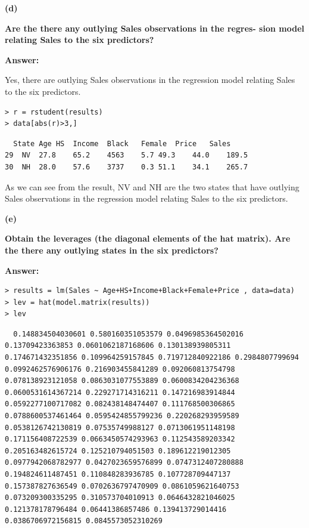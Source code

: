 \documentclass[letterpaper,11pt]{article}
\begin{document}
\begin{addmargin}[-1.1em]{0em}
  \textbf{(d)}\par
\end{addmargin}
\textbf{Are the there any outlying Sales observations in the regres- sion model relating Sales to the six predictors?}\par
\bigbreak
\begin{addmargin}[-0.5em]{0em}
  \textbf{Answer: }
\end{addmargin}

Yes, there are outlying Sales observations in the regression model relating Sales to the six predictors.\par
\begin{lstlisting}
> r = rstudent(results)
> data[abs(r)>3,]
\end{lstlisting}

\begin{lstlisting}
  State	Age	HS	Income	Black	Female	Price	Sales
29	NV	27.8	65.2	4563	5.7	49.3	44.0	189.5
30	NH	28.0	57.6	3737	0.3	51.1	34.1	265.7
\end{lstlisting}

As we can see from the result, NV and NH are the two states that have outlying Sales observations in the regression model relating Sales to the six predictors.

\begin{addmargin}[-1.1em]{0em}
  \textbf{(e)}\par
\end{addmargin}
\textbf{Obtain the leverages (the diagonal elements of the hat matrix). Are the there any outlying states in the six predictors?}\par
\bigbreak
\begin{addmargin}[-0.5em]{0em}
  \textbf{Answer: }
\end{addmargin}

\begin{lstlisting}
> results = lm(Sales ~ Age+HS+Income+Black+Female+Price , data=data)
> lev = hat(model.matrix(results))
> lev
\end{lstlisting}

\begin{lstlisting}
  0.148834504030601 0.580160351053579 0.0496985364502016 0.13709423363853 0.0601062187168606 0.130138939805311 0.174671432351856 0.109964259157845 0.719712840922186 0.2984807799694 0.0992462576906176 0.216903455841289 0.092060813754798 0.078138923121058 0.0863031077553889 0.0600834204236368 0.0600531614367214 0.229271714316211 0.147216983914844 0.0592277100717082 0.082438148474407 0.111768500306865 0.0788600537461464 0.0595424855799236 0.220268293959589 0.0538126742130819 0.07535749988127 0.0713061951148198 0.171156408722539 0.0663450574293963 0.112543589203342 0.205163482615724 0.125210794051503 0.189612219012305 0.0977942068782977 0.0427023659576899 0.0747312407280888 0.194824611487451 0.110848283936785 0.107728709447137 0.157387827636549 0.0702636797470909 0.0861059621640753 0.073209300335295 0.310573704010913 0.0646432821046025 0.121378178796484 0.06441386857486 0.139413729014416 0.0386706972156815 0.0845573052310269
\end{lstlisting}
\end{document}
